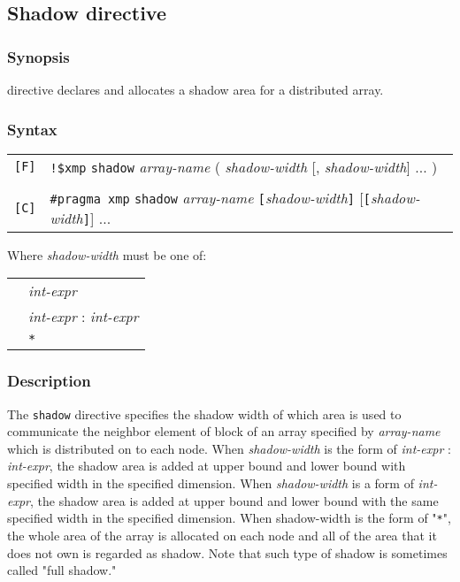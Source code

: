 \subsection{Shadow directive}
\subsubsection*{Synopsis}

{\tt {}} directive declares and allocates a shadow area for a
distributed array.

\subsubsection*{Syntax}

\begin{tabular}{ll}
\verb![F]! & \verb|!$xmp| {\tt shadow} {\it array-name}
( {\it shadow-width} [, {\it shadow-width}] ... ) \\
& \\
\verb![C]! & \verb|#pragma xmp|  {\tt shadow} {\it array-name}
{\tt [}{\it shadow-width}{\tt ]} [{\tt [}{\it shadow-width}{\tt ]}] ... \\
\end{tabular}
\vspace{0.3cm}

Where {\it shadow-width} must be one of:

\begin{tabular}{ll}
 \hspace{0.5cm} & {\it int-expr} \\
 & {\it int-expr} : {\it int-expr}\\
 & \verb|*|\\
\end{tabular}

\subsubsection*{Description}

The {\tt shadow} directive
specifies the shadow width of which area is used to communicate the
neighbor element of block of an array specified by {\it array-name}
which is distributed
on to each node. When {\it shadow-width} is the form of
{\it int-expr} : {\it int-expr}, the shadow area is added at upper bound and
lower bound with specified width in the specified dimension. When
{\it shadow-width} is a form of {\it int-expr}, the shadow area is added at upper
bound and lower bound with the same specified width in the specified
dimension. When shadow-width is the form of "\verb|*|", the whole area of the
array is allocated on each node and all of the area that it does not own
is regarded as shadow. Note that such type of shadow is sometimes called
"full shadow."

